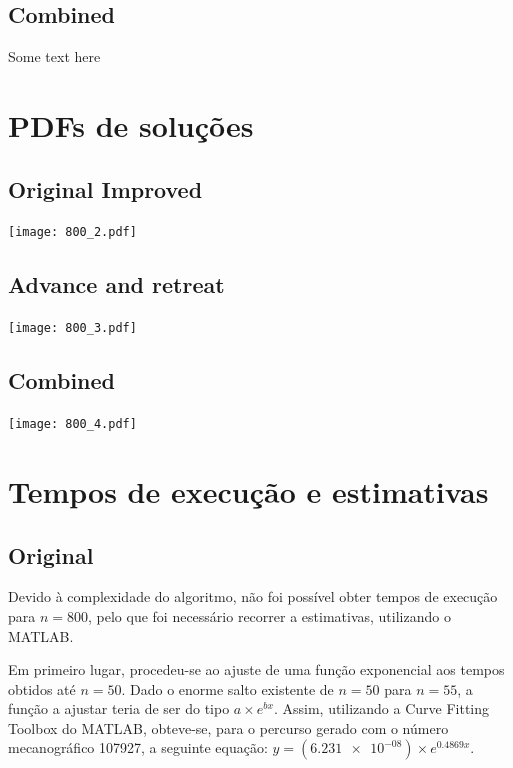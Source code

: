 \documentclass[portuguese,11pt,a4paper,titlepage]{article}
\begin{document}
\subsection{Combined}
Some text here
\pagebreak

\section{PDFs de soluções}
\subsection{Original Improved}
\texttt{[image: 800\_2.pdf]}
\subsection{Advance and retreat}
\texttt{[image: 800\_3.pdf]}
\subsection{Combined}
\texttt{[image: 800\_4.pdf]}
\pagebreak

\section{Tempos de execução e estimativas}
\subsection{Original}
Devido à complexidade do algoritmo, não foi possível obter tempos de execução para \begin{math}n = 800\end{math},
pelo que foi necessário recorrer a estimativas, utilizando o MATLAB.

Em primeiro lugar, procedeu-se ao ajuste de uma função exponencial aos tempos obtidos
até \begin{math}n = 50\end{math}.
Dado o enorme salto existente de \begin{math}n = 50\end{math} para \begin{math}n = 55\end{math},
a função a ajustar teria de ser do tipo \begin{math}a\times e^{bx}\end{math}.
Assim, utilizando a Curve Fitting Toolbox do MATLAB, obteve-se,
para o percurso gerado com o número mecanográfico 107927,
a seguinte equação: \begin{math}y = (\num{6.231e-08})\times e^{0.4869x}\end{math}.
\end{document}

